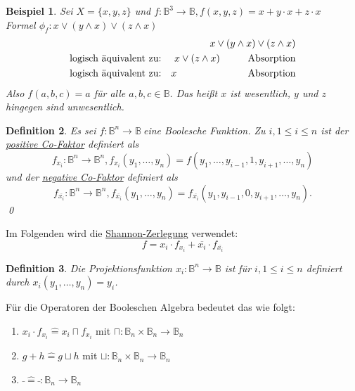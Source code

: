 \documentclass[ngerman]{scrartcl}
\theoremstyle{custom}
\newtheorem{mdef}{Definition} \numberwithin{mdef}{subsection}
\newtheorem{mex}[mdef]{Beispiel}
\newcommand{\0}{\mathbf{0}}
\newcommand{\1}{\mathbf{L}}
\newcommand{\bol}{\mathds{B}^n \rightarrow \mathds{B}}
\newcommand{\bolf}{$f: \bol~$}
\begin{document}
\begin{mex}
Sei $X = \{x ,y ,z \} $ und $f: \mathds{B}^3 \rightarrow \mathds{B},
f(x,y,z) = x + y \cdot x + z \cdot x$\\
Formel $\phi_f: x \vee (y \wedge x) \vee (z \wedge x)$
\begin{eqnarray*}
&&x \vee (y \wedge x) \vee (z \wedge x) \\
&\text{logisch \"aquivalent zu:}& x \vee (z \wedge x) \hspace{1cm} \text{Absorption}\\
&\text{logisch \"aquivalent zu:}& x \hspace{2,55cm} \text{Absorption}
\end{eqnarray*}
Also $f(a,b,c) = a$  f\"ur alle $a,b,c \in \mathds{B}$. Das hei\ss t
$x$ ist wesentlich, $y$ und $z$ hingegen sind unwesentlich.
\end{mex}

\begin{mdef}
Es sei \bolf eine Boolesche Funktion. Zu $i, 1 \leq i \leq n$ ist der
\underline{positive Co-Faktor} definiert als
\begin{equation*}
f_{x_i}: \mathds{B}^n \rightarrow \mathds{B}^n, f_{x_i}(y_1, \dots,
y_n)= f(y_1, \dots, y_{i-1}, 1, y_{i+1}, \dots, y_n)
\end{equation*}
und der \underline{negative Co-Faktor} definiert als
\begin{equation*}
f_{\overline{x_i}}: \mathds{B}^n \rightarrow \mathds{B}^n,
f_{\overline{x_i}}(y_1, \dots, y_n) = f_{\overline{x_i}}(y_1, y_{i-1},
0, y_{i+1}, \dots, y_n).
\end{equation*}
\qed
\end{mdef}

Im Folgenden wird die \underline{Shannon-Zerlegung} verwendet:
\begin{equation*} f = x_i \cdot f_{x_i} + \overline{x_i} \cdot
  f_{\overline{x_i}} \end{equation*}

\begin{mdef}
Die Projektionsfunktion $x_i: \bol$ ist f\"ur $i, 1 \leq i \leq n$
definiert durch $x_i(y_1, \dots, y_n) = y_i$.
\end{mdef}

F\"ur die Operatoren der Booleschen Algebra bedeutet das wie folgt:\\
\begin{enumerate}
\item $x_i \cdot f_{x_i} \mathrel{\widehat{=}} x_i \sqcap f_{x_i}$ mit
$\sqcap: \mathds{B}_n \times \mathds{B}_n \rightarrow \mathds{B}_n$
\item $g + h \mathrel{\widehat{=}} g \sqcup h$ mit
$\sqcup: \mathds{B}_n \times \mathds{B}_n \rightarrow \mathds{B}_n$
\item $\bar ~ \mathrel{\widehat{=}} \bar ~: \mathds{B}_n
  \rightarrow \mathds{B}_n$
\end{enumerate}
\end{document}
